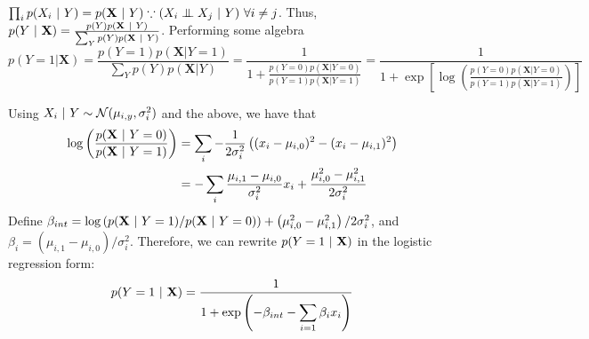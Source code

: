 

$\prod_i p(X_i~\vert~ Y) = p(\mathbf{X} ~\vert~ Y) \because (X_i \mathrel{\perp\mkern-10mu\perp} X_j ~\vert~ Y) ~\forall i \neq j$. Thus, $p(Y ~\vert~ \mathbf{X}) = \frac{p(Y) p(\mathbf{X}~\vert~ Y)}{\sum_Y p(Y) p(\mathbf{X}~\vert~ Y)}$. Performing some algebra
$$
p(Y=1 | \mathbf{X}) = \frac{p(Y=1) p(\mathbf{X} | Y=1)}{\sum_Y p(Y) p(\mathbf{X}| Y)} = \frac{1}{1 + \frac{p(Y=0)p(\mathbf{X}|Y=0)}{p(Y=1)p(\mathbf{X}| Y=1)}} = \frac{1}{1 + \exp{\left[\log\left(\frac{p(Y=0)p(\mathbf{X}|Y=0)}{p(Y=1)p(\mathbf{X}| Y=1)}\right)\right]}} 
$$

Using $X_i ~\vert~ Y \sim \mathcal{N}(\mu_{i,y},\sigma_i^2)$ and the above, we have that
\begin{align*}
    \log\left(\frac{p(\mathbf{X} ~\vert~ Y=0)}{p(\mathbf{X} ~\vert~ Y=1)}\right)
    &= \sum_i -\frac{1}{2 \sigma_i^2} \left((x_i - \mu_{i,0})^2 - (x_i - \mu_{i,1})^2\right)\\
    &= -\sum_i \frac{\mu_{i,1} - \mu_{i,0}}{\sigma_i^2} x_i + \frac{\mu_{i,0}^2 - \mu_{i,1}^2}{2\sigma_i^2}
\end{align*}
Define $\beta_{int} = \log\left(p(\mathbf{X}~\vert~ Y=1)/p(\mathbf{X} ~\vert~ Y=0)\right) + \left(\mu_{i,0}^2 - \mu_{i,1}^2\right)/2\sigma_i^2$, and $\beta_i = \left(\mu_{i,1} - \mu_{i,0}\right)/\sigma_i^2$. Therefore, we can rewrite $p(Y = 1 ~\vert~ \mathbf{X})$ in the logistic regression form:
\begin{equation*}
    p(Y = 1 ~\vert~ \mathbf{X}) = \frac{1}{1 + \exp\left(-\beta_{int} - \displaystyle\sum_{i=1}\beta_i x_i\right)}
\end{equation*}
